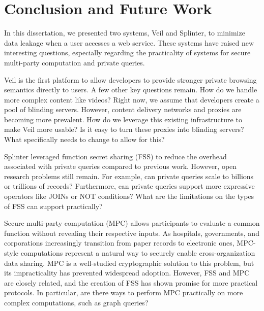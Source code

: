 \section{Conclusion and Future Work}
\label{chap:concl}

In this dissertation, we presented two systems, Veil and Splinter,
to minimize data leakage when a user accesses a web service. 
These systems have raised new interesting questions,
especially regarding the practicality of 
systems for secure multi-party computation and private queries.

Veil is the first platform to allow developers to provide stronger
private browsing semantics directly to users. A few other key questions remain.
How do we handle more complex content like videos? Right now, we assume
that developers create a pool of blinding servers. However, content delivery
networks and proxies are becoming more prevalent. How do we leverage this
existing infrastructure to make Veil more usable? Is it easy to turn
these proxies into blinding servers? What specifically needs to change to allow
for this? 

Splinter leveraged
function secret sharing (FSS) to reduce the overhead associated with private queries compared to previous
work. However, open research problems still remain. For example, can private queries scale to billions
or trillions of records? Furthermore, can private queries support more expressive operators like JOINs or
NOT conditions? What are the limitations on the types of FSS can support practically?

Secure multi-party computation (MPC) allows participants to evaluate a common function without revealing
their respective inputs. As hospitals, governments, and corporations increasingly transition from
paper records to electronic ones, MPC-style computations represent a natural way to securely enable
cross-organization data sharing. MPC is a well-studied cryptographic solution to this problem, but its
impracticality has prevented widespread adoption. However, FSS and MPC are closely related, and 
the creation of FSS has shown promise for more practical protocols. In particular,
are there ways to perform MPC practically on more complex computations, such as graph queries?



